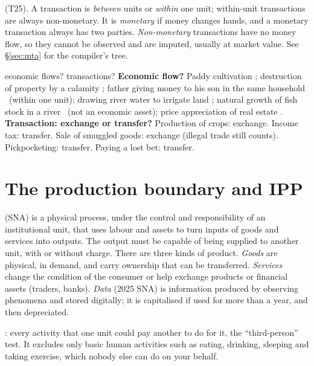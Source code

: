  (T25). A transaction is \emph{between} units or \emph{within} one unit;
within-unit transactions are always non-monetary. It is \emph{monetary} if money changes hands,
and a monetary transaction always has two parties. \emph{Non-monetary} transactions have no
money flow, so they cannot be observed and are imputed, usually at market value. See
\S\ref{sec:mta} for the compiler's tree.

\begin{quick}{economic flows? transactions?}
\small \textbf{Economic flow?} Paddy cultivation \yes; destruction of property by a calamity \yes;
father giving money to his son in the same household \no\ (within one unit); drawing river water
to irrigate land \yes; natural growth of fish stock in a river \no\ (not an economic asset);
price appreciation of real estate \yes.\\
\textbf{Transaction: exchange or transfer?} Production of crops: exchange. Income tax: transfer.
Sale of smuggled goods: exchange (illegal trade still counts). Pickpocketing: transfer. Paying a
lost bet: transfer.
\end{quick}

\section{The production boundary and IPP}\label{sec:boundary}

 (SNA) is a physical process, under the control and responsibility of an
institutional unit, that uses labour and assets to turn inputs of goods and services into
outputs. The output must be capable of being supplied to another unit, with or without charge.
There are three kinds of product. \emph{Goods} are physical, in demand, and carry ownership that
can be transferred. \emph{Services} change the condition of the consumer or help exchange
products or financial assets (traders, banks). \emph{Data} (2025 SNA) is information produced by
observing phenomena and stored digitally; it is capitalised if used for more than a year, and
then depreciated.

: every activity that one unit could pay another to do for it,
the ``third-person'' test. It excludes only basic human activities such as eating, drinking,
sleeping and taking exercise, which nobody else can do on your behalf.


